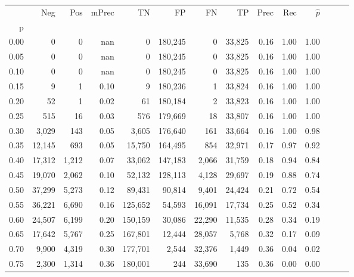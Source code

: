 \begin{tabular}{rrrrrrrrrrrrrr}
\toprule
{} &     Neg &    Pos & mPrec &       TN &       FP &      FN &      TP &  Prec &   Rec & $\hat{p}$ \\
p    &         &        &       &          &          &         &         &       &       &           \\
\midrule
0.00 &       0 &      0 &   nan &        0 &  180,245 &       0 &  33,825 &  0.16 &  1.00 &      1.00 \\
0.05 &       0 &      0 &   nan &        0 &  180,245 &       0 &  33,825 &  0.16 &  1.00 &      1.00 \\
0.10 &       0 &      0 &   nan &        0 &  180,245 &       0 &  33,825 &  0.16 &  1.00 &      1.00 \\
0.15 &       9 &      1 &  0.10 &        9 &  180,236 &       1 &  33,824 &  0.16 &  1.00 &      1.00 \\
0.20 &      52 &      1 &  0.02 &       61 &  180,184 &       2 &  33,823 &  0.16 &  1.00 &      1.00 \\
0.25 &     515 &     16 &  0.03 &      576 &  179,669 &      18 &  33,807 &  0.16 &  1.00 &      1.00 \\
0.30 &   3,029 &    143 &  0.05 &    3,605 &  176,640 &     161 &  33,664 &  0.16 &  1.00 &      0.98 \\
0.35 &  12,145 &    693 &  0.05 &   15,750 &  164,495 &     854 &  32,971 &  0.17 &  0.97 &      0.92 \\
0.40 &  17,312 &  1,212 &  0.07 &   33,062 &  147,183 &   2,066 &  31,759 &  0.18 &  0.94 &      0.84 \\
0.45 &  19,070 &  2,062 &  0.10 &   52,132 &  128,113 &   4,128 &  29,697 &  0.19 &  0.88 &      0.74 \\
0.50 &  37,299 &  5,273 &  0.12 &   89,431 &   90,814 &   9,401 &  24,424 &  0.21 &  0.72 &      0.54 \\
0.55 &  36,221 &  6,690 &  0.16 &  125,652 &   54,593 &  16,091 &  17,734 &  0.25 &  0.52 &      0.34 \\
0.60 &  24,507 &  6,199 &  0.20 &  150,159 &   30,086 &  22,290 &  11,535 &  0.28 &  0.34 &      0.19 \\
0.65 &  17,642 &  5,767 &  0.25 &  167,801 &   12,444 &  28,057 &   5,768 &  0.32 &  0.17 &      0.09 \\
0.70 &   9,900 &  4,319 &  0.30 &  177,701 &    2,544 &  32,376 &   1,449 &  0.36 &  0.04 &      0.02 \\
0.75 &   2,300 &  1,314 &  0.36 &  180,001 &      244 &  33,690 &     135 &  0.36 &  0.00 &      0.00 \\

\end{tabular}
